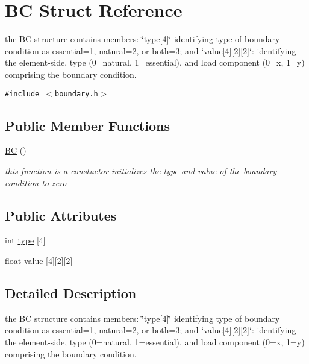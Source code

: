 \hypertarget{structBC}{
\section{BC Struct Reference}
\label{structBC}
}
the BC structure contains members: \char`\"{}type\mbox{[}4\mbox{]}\char`\"{} identifying type of boundary condition as essential=1, natural=2, or both=3; and \char`\"{}value\mbox{[}4\mbox{]}\mbox{[}2\mbox{]}\mbox{[}2\mbox{]}\char`\"{}: identifying the element-side, type (0=natural, 1=essential), and load component (0=x, 1=y) comprising the boundary condition.  


{\tt \#include $<$boundary.h$>$}

\subsection*{Public Member Functions}
\begin{CompactItemize}
\item 
\hyperlink{structBC_a0}{BC} ()
\begin{CompactList}\small\item\em this function is a constuctor initializes the type and value of the boundary condition to zero \item\end{CompactList}\end{CompactItemize}
\subsection*{Public Attributes}
\begin{CompactItemize}
\item 
int \hyperlink{structBC_o0}{type} \mbox{[}4\mbox{]}
\item 
float \hyperlink{structBC_o1}{value} \mbox{[}4\mbox{]}\mbox{[}2\mbox{]}\mbox{[}2\mbox{]}
\end{CompactItemize}


\subsection{Detailed Description}
the BC structure contains members: \char`\"{}type\mbox{[}4\mbox{]}\char`\"{} identifying type of boundary condition as essential=1, natural=2, or both=3; and \char`\"{}value\mbox{[}4\mbox{]}\mbox{[}2\mbox{]}\mbox{[}2\mbox{]}\char`\"{}: identifying the element-side, type (0=natural, 1=essential), and load component (0=x, 1=y) comprising the boundary condition. 



